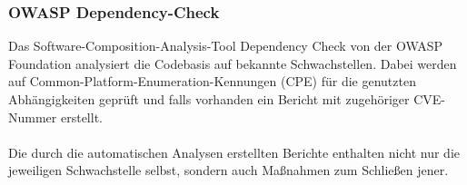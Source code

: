 \subsubsection{OWASP Dependency-Check} \label{sec:OWASP-Dependency-Check}
Das Software-Composition-Analysis-Tool Dependency Check von der OWASP Foundation analysiert die Codebasis auf bekannte Schwachstellen.
Dabei werden auf Common-Platform-Enumeration-Kennungen (CPE) für die genutzten Abhängigkeiten geprüft und falls vorhanden ein Bericht mit zugehöriger \ac{CVE}-Nummer erstellt.
\\ \\
Die durch die automatischen Analysen erstellten Berichte enthalten nicht nur die jeweiligen Schwachstelle selbst, sondern auch Maßnahmen zum Schließen jener.